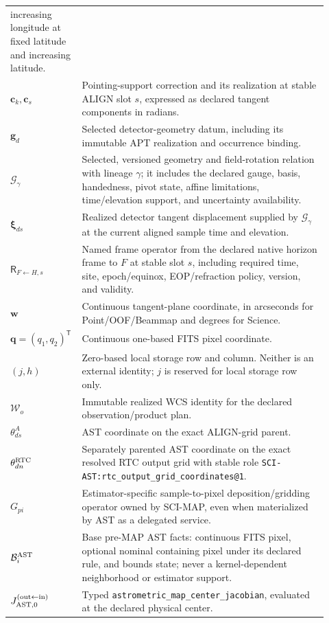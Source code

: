 \begin{longtable}{>{\raggedright\arraybackslash}p{0.16\linewidth}
                  >{\raggedright\arraybackslash}p{0.76\linewidth}}
increasing longitude at fixed latitude and increasing latitude. \\
$\boldsymbol c_k,\boldsymbol c_s$ & Pointing-support correction and its
realization at stable ALIGN slot $s$, expressed as declared tangent
components in radians. \\
$\boldsymbol g_d$ & Selected detector-geometry datum, including its immutable
APT realization and occurrence binding. \\
$\mathcal G_\gamma$ & Selected, versioned geometry and field-rotation relation
with lineage $\gamma$; it includes the declared gauge, basis, handedness,
pivot state, affine limitations, time/elevation support, and uncertainty
availability. \\
$\boldsymbol\xi_{ds}$ & Realized detector tangent displacement supplied by
$\mathcal G_\gamma$ at the current aligned sample time and elevation. \\
$\mathsf R_{F\leftarrow H,s}$ & Named frame operator from the declared native
horizon frame to $F$ at stable slot $s$, including required time, site,
epoch/equinox, EOP/refraction policy, version, and validity. \\
$\boldsymbol w$ & Continuous tangent-plane coordinate, in arcseconds for
Point/OOF/Beammap and degrees for Science. \\
$\boldsymbol q=(q_1,q_2)^\mathsf T$ & Continuous one-based FITS pixel
coordinate. \\
$(j,h)$ & Zero-based local storage row and column.  Neither is an external
identity; $j$ is reserved for local storage row only. \\
$\mathcal W_o$ & Immutable realized WCS identity for the declared
observation/product plan. \\
$\theta^A_{ds}$ & AST coordinate on the exact ALIGN-grid parent. \\
$\theta^{\rm RTC}_{dn}$ & Separately parented AST coordinate on the exact
resolved RTC output grid with stable role
\texttt{SCI-AST:rtc\_output\_grid\_coordinates@1}. \\
$G_{pi}$ & Estimator-specific sample-to-pixel deposition/gridding operator
owned by SCI-MAP, even when materialized by AST as a delegated service. \\
$\mathcal B^{\rm AST}_i$ & Base pre-MAP AST facts: continuous FITS pixel,
optional nominal containing pixel under its declared rule, and bounds state;
never a kernel-dependent neighborhood or estimator support. \\
$J_{\rm AST,0}^{({\rm out}\leftarrow{\rm in})}$ & Typed
\texttt{astrometric\_map\_center\_jacobian}, evaluated at the declared
physical center. \\
\bottomrule
\end{longtable}


